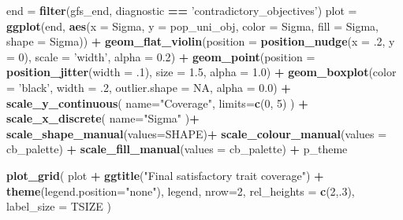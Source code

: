 \documentclass[]{book}
\newenvironment{Shaded}{\begin{snugshade}}{\end{snugshade}}
\newcommand{\DataTypeTok}[1]{\textcolor[rgb]{0.13,0.29,0.53}{#1}}
\newcommand{\DecValTok}[1]{\textcolor[rgb]{0.00,0.00,0.81}{#1}}
\newcommand{\FloatTok}[1]{\textcolor[rgb]{0.00,0.00,0.81}{#1}}
\newcommand{\KeywordTok}[1]{\textcolor[rgb]{0.13,0.29,0.53}{\textbf{#1}}}
\newcommand{\NormalTok}[1]{#1}
\newcommand{\OperatorTok}[1]{\textcolor[rgb]{0.81,0.36,0.00}{\textbf{#1}}}
\newcommand{\OtherTok}[1]{\textcolor[rgb]{0.56,0.35,0.01}{#1}}
\newcommand{\StringTok}[1]{\textcolor[rgb]{0.31,0.60,0.02}{#1}}
\begin{document}
\begin{Shaded}
\begin{Highlighting}[]
\NormalTok{end =}\StringTok{ }\KeywordTok{filter}\NormalTok{(gfs_end, diagnostic }\OperatorTok{==}\StringTok{ 'contradictory_objectives'}\NormalTok{)}
\NormalTok{plot =}\StringTok{ }\KeywordTok{ggplot}\NormalTok{(end, }\KeywordTok{aes}\NormalTok{(}\DataTypeTok{x =}\NormalTok{ Sigma, }\DataTypeTok{y =}\NormalTok{ pop_uni_obj, }\DataTypeTok{color =}\NormalTok{ Sigma, }\DataTypeTok{fill =}\NormalTok{ Sigma, }\DataTypeTok{shape =}\NormalTok{ Sigma)) }\OperatorTok{+}
\StringTok{  }\KeywordTok{geom_flat_violin}\NormalTok{(}\DataTypeTok{position =} \KeywordTok{position_nudge}\NormalTok{(}\DataTypeTok{x =} \FloatTok{.2}\NormalTok{, }\DataTypeTok{y =} \DecValTok{0}\NormalTok{), }\DataTypeTok{scale =} \StringTok{'width'}\NormalTok{, }\DataTypeTok{alpha =} \FloatTok{0.2}\NormalTok{) }\OperatorTok{+}
\StringTok{  }\KeywordTok{geom_point}\NormalTok{(}\DataTypeTok{position =} \KeywordTok{position_jitter}\NormalTok{(}\DataTypeTok{width =} \FloatTok{.1}\NormalTok{), }\DataTypeTok{size =} \FloatTok{1.5}\NormalTok{, }\DataTypeTok{alpha =} \FloatTok{1.0}\NormalTok{) }\OperatorTok{+}
\StringTok{  }\KeywordTok{geom_boxplot}\NormalTok{(}\DataTypeTok{color =} \StringTok{'black'}\NormalTok{, }\DataTypeTok{width =} \FloatTok{.2}\NormalTok{, }\DataTypeTok{outlier.shape =} \OtherTok{NA}\NormalTok{, }\DataTypeTok{alpha =} \FloatTok{0.0}\NormalTok{) }\OperatorTok{+}
\StringTok{  }\KeywordTok{scale_y_continuous}\NormalTok{(}
    \DataTypeTok{name=}\StringTok{"Coverage"}\NormalTok{,}
    \DataTypeTok{limits=}\KeywordTok{c}\NormalTok{(}\DecValTok{0}\NormalTok{, }\DecValTok{5}\NormalTok{)}
\NormalTok{  ) }\OperatorTok{+}
\StringTok{  }\KeywordTok{scale_x_discrete}\NormalTok{(}
    \DataTypeTok{name=}\StringTok{"Sigma"}
\NormalTok{  )}\OperatorTok{+}
\StringTok{  }\KeywordTok{scale_shape_manual}\NormalTok{(}\DataTypeTok{values=}\NormalTok{SHAPE)}\OperatorTok{+}
\StringTok{  }\KeywordTok{scale_colour_manual}\NormalTok{(}\DataTypeTok{values =}\NormalTok{ cb_palette) }\OperatorTok{+}
\StringTok{  }\KeywordTok{scale_fill_manual}\NormalTok{(}\DataTypeTok{values =}\NormalTok{ cb_palette) }\OperatorTok{+}
\StringTok{  }\NormalTok{p_theme}

\KeywordTok{plot_grid}\NormalTok{(}
\NormalTok{  plot }\OperatorTok{+}
\StringTok{    }\KeywordTok{ggtitle}\NormalTok{(}\StringTok{"Final satisfactory trait coverage"}\NormalTok{) }\OperatorTok{+}
\StringTok{    }\KeywordTok{theme}\NormalTok{(}\DataTypeTok{legend.position=}\StringTok{"none"}\NormalTok{),}
\NormalTok{  legend,}
  \DataTypeTok{nrow=}\DecValTok{2}\NormalTok{,}
  \DataTypeTok{rel_heights =} \KeywordTok{c}\NormalTok{(}\DecValTok{2}\NormalTok{,.}\DecValTok{3}\NormalTok{),}
  \DataTypeTok{label_size =}\NormalTok{ TSIZE}
\NormalTok{)}
\end{Highlighting}
\end{Shaded}
\end{document}
